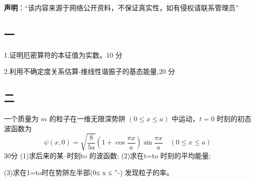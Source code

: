 
\textbf{声明}：“该内容来源于网络公开资料，不保证真实性，如有侵权请联系管理员”

\subsection{一}
1.证明厄密算符的本征值为实数。10 分

2.利用不确定度关系估算-维线性谐振子的基态能量,20 分

\subsection{二}
一个质量为 $m$ 的粒子在一维无限深势阱 $ (0 \leq x \leq a) $ 中运动，$t = 0$ 时刻的初态波函数为
$$\psi(x, 0) = \sqrt{\frac{8}{5a}} (1 + \cos \frac{\pi x}{a}) \sin \frac{\pi x}{a} \quad (0 \leq x \leq a)~$$ 30分
(1)求后来的某--时刻to 的波函数;
(2)求在t=to 时刻的平均能量;

(3)求在1=to时在势阱左半部(0≤ x ≤ ”-) 发现粒子的率。
